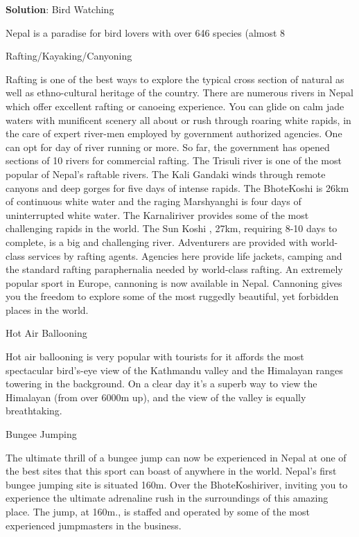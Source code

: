 \documentclass[
  openany]{book}
\newenvironment{solution}{ {\bfseries Solution}:}{}
\begin{document}
\begin{questions}
\begin{solution}
Bird Watching

Nepal is a paradise for bird lovers with over 646 species (almost 8%

Rafting/Kayaking/Canyoning

Rafting  is one of the best ways to explore the typical cross section of natural as well as ethno-cultural heritage of the country. There are numerous rivers in Nepal which offer excellent rafting or canoeing experience. You can glide on calm jade waters with munificent scenery all about or rush through roaring white rapids, in the care of expert river-men employed by government authorized agencies. One can opt for day of river running or more. So far, the government has opened sections of 10 rivers for commercial rafting. The Trisuli river  is one of the most popular of Nepal’s raftable rivers. The Kali Gandaki winds through remote canyons and deep gorges for five days of intense rapids. The BhoteKoshi is 26km of continuous white water and the raging Marshyanghi is four days of uninterrupted white water. The Karnaliriver provides some of the most challenging rapids in the world. The Sun Koshi , 27km, requiring 8-10 days to complete, is a big and challenging river. Adventurers are provided with world-class services by rafting agents. Agencies here provide life jackets, camping and the standard rafting paraphernalia needed by world-class rafting. An extremely popular sport in Europe, cannoning is now available in Nepal. Cannoning gives you the freedom to explore some of the most ruggedly beautiful, yet forbidden places in the world.

Hot Air Ballooning

Hot air ballooning is very popular with tourists for it affords the most spectacular bird's-eye view of the Kathmandu valley and the Himalayan ranges towering in the background. On a clear day it's a superb way to view the Himalayan (from over 6000m up), and the view of the valley is equally breathtaking.

Bungee Jumping

The ultimate thrill of a bungee jump can now be experienced in Nepal at one of the best sites that this sport can boast of anywhere in the world. Nepal's first bungee jumping site is situated 160m. Over the BhoteKoshiriver, inviting you to experience the ultimate adrenaline rush in the surroundings of this amazing place. The jump, at 160m., is staffed and operated by some of the most experienced jumpmasters in the business.


\end{solution}
\end{questions}
\end{document}
